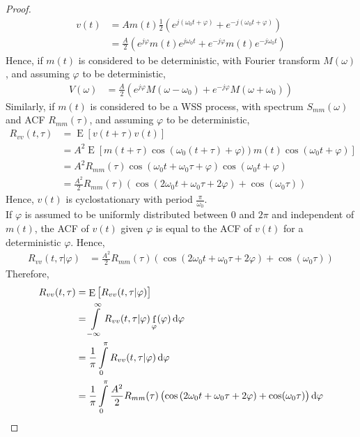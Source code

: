 \documentclass[titlepage, fleqn, a4paper, 12pt, twoside]{article}
\theoremstyle{definition}
\theoremstyle{theorem}
\DeclareMathOperator{\pdf}{\mathrm{f}}
\DeclareMathOperator{\expct}{\mathrm{E}}
\begin{document}
\begin{proof}
	\begin{align*}
		v(t) &= A m(t) \frac{1}{2} \left( e^{j (\omega_0 t + \varphi)} + e^{-j (\omega_0 t + \varphi)} \right)\\
		&= \frac{A}{2} \left( e^{j \varphi} m(t) e^{j \omega_0 t} + e^{-j \varphi} m(t) e^{-j \omega_0 t} \right)
	\end{align*}
	Hence, if $m(t)$ is considered to be deterministic, with Fourier transform $M(\omega)$, and assuming $\varphi$ to be deterministic,
	\begin{align*}
		V(\omega) &= \frac{A}{2} \left( e^{j \varphi} M(\omega - \omega_0) + e^{-j \varphi} M(\omega + \omega_0) \right)
	\end{align*}
	Similarly, if $m(t)$ is considered to be a WSS process, with spectrum $S_{m m}(\omega)$ and ACF $R_{m m}(\tau)$, and assuming $\varphi$ to be deterministic,
	\begin{align*}
		R_{v v}(t,\tau) &= \expct\left[ v(t + \tau) v(t) \right]\\
		&= A^2 \expct\left[ m(t + \tau) \cos\left( \omega_0 (t + \tau) + \varphi) \right) m(t) \cos(\omega_0 t + \varphi) \right]\\
		&= A^2 R_{m m}(\tau) \cos\left( \omega_0 t + \omega_0 \tau + \varphi \right) \cos(\omega_0 t + \varphi)\\
		&= \frac{A^2}{2} R_{m m}(\tau) \left( \cos(2 \omega_0 t + \omega_0 \tau + 2 \varphi) + \cos(\omega_0 \tau) \right)
	\end{align*}
	Hence, $v(t)$ is cyclostationary with period $\frac{\pi}{\omega_0}$.\\
	If $\varphi$ is assumed to be uniformly distributed between $0$ and $2 \pi$ and independent of $m(t)$, the ACF of $v(t)$ given $\varphi$ is equal to the ACF of $v(t)$ for a deterministic $\varphi$.
	Hence,
	\begin{align*}
		R_{v v}(t,\tau | \varphi) &= \frac{A^2}{2} R_{m m}(\tau) \left( \cos(2 \omega_0 t + \omega_0 \tau + 2 \varphi) + \cos(\omega_0 \tau) \right)
	\end{align*}
	Therefore,
	\begin{align*}
		R_{v v}(t,\tau) &= \expct\left[ R_{v v}(t,\tau | \varphi) \right]\\
		&= \int\limits_{-\infty}^{\infty} R_{v v}(t,\tau | \varphi) \pdf_{\varphi}(\varphi) \dif \varphi\\
		&= \frac{1}{\pi} \int\limits_{0}^{\pi} R_{v v}(t,\tau | \varphi) \dif \varphi\\
		&= \frac{1}{\pi} \int\limits_{0}^{\pi} \frac{A^2}{2} R_{m m}(\tau) \left( \cos\left( 2 \omega_0 t + \omega_0 \tau + 2 \varphi \right) + \cos(\omega_0 \tau) \right) \dif \varphi\\

\end{align*}
\end{proof}
\end{document}
